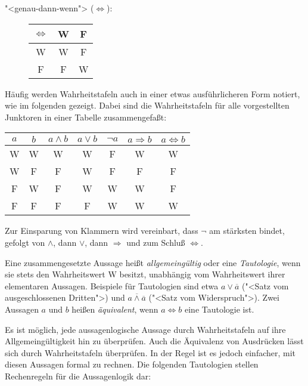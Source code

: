 \begin{description}
\item["<genau-dann-wenn"> ($\Leftrightarrow$):]
\hspace{2em}\begin{tabular}{c||c|c}
$\Leftrightarrow$     &  W   &  F \\ \hline \hline
    W      &  W   &  F \\ \hline
    F      &  F   &  W 
\end{tabular}
\end{description}

Häufig werden Wahrheitstafeln auch in einer etwas
ausführlicheren Form notiert, wie im folgenden gezeigt.  Dabei sind die
Wahrheitstafeln für alle vorgestellten Junktoren in einer Tabelle
zusammengefaßt:

\begin{center}
\begin{tabular}{c|c||c|c|c|c|c}
$a$ & $b$ & $a\wedge b$ & $a\vee b$ & $\neg a$ & $a\Rightarrow b$ & $a\Leftrightarrow b$\\ \hline\hline
W   &  W  &     W       &     W     &    F     &         W        & W\\ \hline
W   &  F  &     F       &     W     &    F     &         F        & F\\ \hline
F   &  W  &     F       &     W     &    W     &         W        & F\\ \hline
F   &  F  &     F       &     F     &    W     &         W        & W
\end{tabular}
\end{center}
%
Zur Einsparung von Klammern wird vereinbart, dass $\neg$ am stärksten 
\label{prio}
bindet, gefolgt von $\wedge$, dann $\vee$, dann $\Rightarrow$ und zum Schluß 
$\Leftrightarrow$.

Eine zusammengesetzte Aussage heißt \emph{allgemeingültig} oder eine
\emph{Tautologie}, 
wenn sie stets den Wahrheitswert W besitzt, unabhängig vom
Wahr\-heits\-wert ihrer elementaren  Aussagen. Beispiele für Tautologien sind
etwa $a \vee \overline{a}$ ("<Satz vom ausgeschlossenen Dritten">)
und $\overline{a \wedge \overline{a}}$ ("<Satz vom Widerspruch">). Zwei 
Aussagen
$a$ und $b$ heißen \emph{äquivalent}, wenn $a \Leftrightarrow b$ eine
Tautologie ist.

Es ist möglich, jede aussagenlogische Aussage durch
Wahrheitstafeln auf ihre Allgemeingültigkeit hin zu überprüfen.  Auch
die Äquivalenz von Ausdrücken lässt sich durch Wahrheitstafeln
überprüfen.  In der Regel ist es jedoch einfacher, mit diesen
Aussagen formal zu rechnen.
Die folgenden Tautologien stellen Rechenregeln für die Aussagenlogik
dar:

